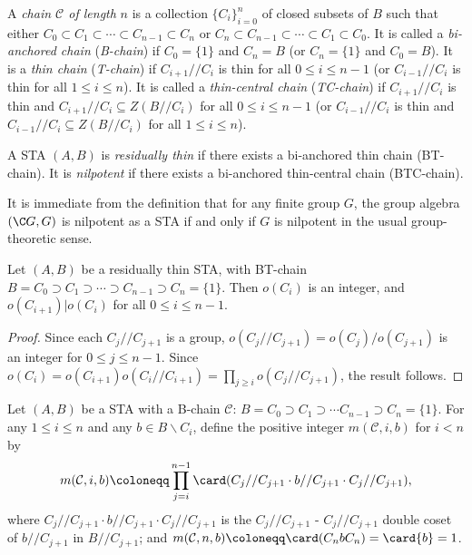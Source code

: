 \begin{defi}
\label{def:chain}
A \emph{chain $\mathcal{C}$ of length} $n$ is a collection $\{C_i\}_{i=0}^n$
of closed subsets of $B$ such that either $C_0 \subset C_1 \subset
\cdots \subset C_{n-1} \subset C_n$ or $C_n \subset C_{n-1} \subset
\cdots \subset C_1 \subset C_0$. 
 It is called a \emph{bi-anchored chain}
(\emph{B-chain}) if $C_0 = \{1\}$ and $C_n = B$ (or $C_n = \{1\}$ and
$C_0 = B$). It is a \emph{thin chain} (\emph{T-chain}) if $C_{i+1}//C_i$
is thin for all $0 \leq i \leq n-1$ (or $C_{i-1}//C_i$ is thin for all
$1 \leq i \leq n$). It is called a \emph{thin-central chain}
(\emph{TC-chain}) if $C_{i+1}//C_i$ is thin and $C_{i+1}//C_i \subseteq
Z(B//C_i)$ for all $0 \leq i \leq n-1$ (or $C_{i-1}//C_i$ is thin and
$C_{i-1}//C_i \subseteq Z(B//C_i)$ for all $1 \leq i \leq n$).
\end{defi}

\begin{defi}
\label{def:res_thin_nilp}
A STA $(A, B)$ is \emph{residually thin} if there exists a bi-anchored
thin chain (BT-chain). It is \emph{nilpotent} if there exists a
bi-anchored thin-central chain (BTC-chain).
\end{defi}

\begin{rema}
\label{rem:nilp_group}
It is immediate from the definition that for any finite group $G$, the
group algebra $({\C}G, G)$ is nilpotent as a STA if and only if $G$ is
nilpotent in the usual group-theoretic sense.
\end{rema}

\begin{prop}
\label{prop:res_thin_order}
Let $(A, B)$ be a residually thin STA, with BT-chain $B = C_0 \supset
C_1 \supset \cdots \supset C_{n-1} \supset C_n = \{1\}$. Then $o(C_i)$
is an integer, and $o(C_{i+1}) \vert o(C_i)$ for all $0 \leq i \leq
n-1$.
\end{prop}

\begin{proof}
Since each $C_j//C_{j+1}$ is a group, $o(C_j//C_{j+1}) =
o(C_j)/o(C_{j+1})$ is an integer for $0 \leq j \leq n-1$. Since $o(C_i)
= o(C_{i+1})o(C_i//C_{i+1}) = \prod_{j \geq i}o(C_j//C_{j+1})$, the
result follows.
\end{proof}

\begin{defi}
\label{def:card_number}
Let $(A, B)$ be a STA with a B-chain $\mathcal{C}$: $B = C_0 \supset C_1
\supset \cdots C_{n-1} \supset C_n = \{1\}$. For any $1 \leq i \leq n$
and any $b \in
B\backslash C_i$, define the positive integer $m(\mathcal{C}, i,
b)$ for $i < n$ by 
\[
m(\mathcal{C}, i, b) \coloneqq \prod_{j=i}^{n-1}\card (C_j//C_{j+1}
\cdot b//C_{j+1} \cdot C_j//C_{j+1}),
\]
where $C_j//C_{j+1} \cdot b//C_{j+1} \cdot C_j//C_{j+1}$ is the
$C_j//C_{j+1}$ - $C_j//C_{j+1}$ double coset of $b//C_{j+1}$ in
$B//C_{j+1}$; and $m(\mathcal{C}, n, b) \coloneqq \card (C_nbC_n) = \card\{b\} = 1$.
\end{defi}
 
